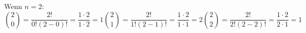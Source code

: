 \documentclass[12pt,a5paper]{book}\thispagestyle{empty}
\begin{document}
Wenn $n = 2$:
\begin{subequations}
	\begin{equation}
	\binom{2}{0} = \frac{2!}{0!(2-0)!} = \frac{1 \cdot 2}{1 \cdot 2} = 1
	\end{equation}
	\begin{equation}
	\binom{2}{1} = \frac{2!}{1!(2-1)!} =  \frac{1 \cdot 2}{1 \cdot 1} = 2
	\end{equation}
	\begin{equation}
	\binom{2}{2} = \frac{2!}{2!(2-2)!} =  \frac{1 \cdot 2}{2 \cdot 1} = 1
	\end{equation}
\end{subequations}
\end{document}

